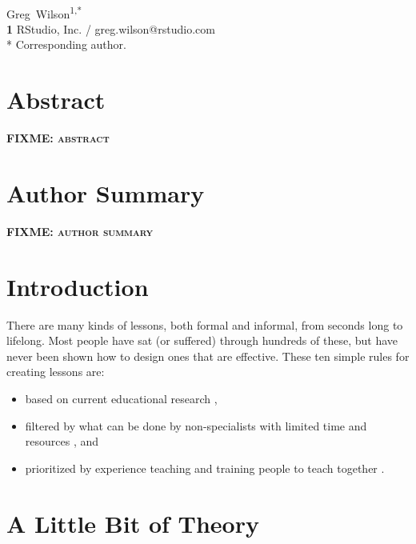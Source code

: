 \documentclass[10pt,letterpaper]{article}
\newcommand{\fixme}[1]{\textsc{\textbf{FIXME: {#1}}}}
\begin{document}
\vspace*{0.2in}

\begin{flushleft}
{\Large
\textbf{}
}
\newline
\\
{Greg~Wilson}\textsuperscript{1,*}
\\
\textbf{1} RStudio, Inc. / greg.wilson@rstudio.com
\\
\bigskip
* Corresponding author.
\end{flushleft}

\section*{Abstract}

\fixme{abstract}

\section*{Author Summary}

\fixme{author summary}

\section*{Introduction}

There are many kinds of lessons, both formal and informal, from seconds long to lifelong.
Most people have sat (or suffered) through hundreds of these,
but have never been shown how to design ones that are effective.
These ten simple rules for creating lessons are:

\begin{itemize}

\item based on current educational research \cite{Nuth2007,Ambr2010,Brow2018},

\item filtered by what can be done by non-specialists
  with limited time and resources \cite{Hust2012,Lang2016,Rice2018},
  and

\item prioritized by experience teaching and training people to teach together
  \cite{Deve2018,Wils2016,Wils2018}.

\end{itemize}

\section*{A Little Bit of Theory}
\end{document}
